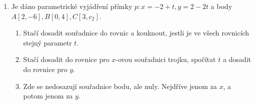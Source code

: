 \documentclass[]{article}
\begin{document}
\begin{enumerate}
		\item Je dáno parametrické vyjádření přímky $p: x = -2 + t, y = 2 - 2t$ a body $A[2, -6], B[0,4], C[3, c_2]$.
		\begin{enumerate}
			\item Stačí dosadit souřadnice do rovnic a kouknout, jestli je ve všech rovnicích stejný parametr $t$.
			\item Stačí dosadit do rovnice pro $x$-ovou souřadnici trojku, spočítat $t$ a dosadit do rovnice pro $y$.
			\item Zde se nedosazují souřadnice bodu, ale nuly. Nejdříve jenom za $x$, a potom jenom za $y$.
		\end{enumerate}
	\end{enumerate}
\end{document}
